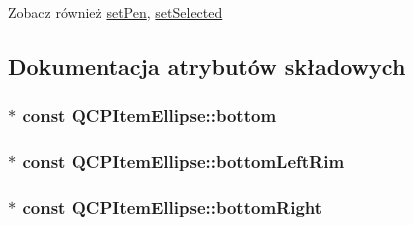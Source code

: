 \begin{DoxySeeAlso}{Zobacz również}
\hyperlink{class_q_c_p_item_ellipse_adb81a663ed2420fcfa011e49f678d1a6}{set\+Pen}, \hyperlink{class_q_c_p_abstract_item_a203de94ad586cc44d16c9565f49d3378}{set\+Selected} 
\end{DoxySeeAlso}


\subsection{Dokumentacja atrybutów składowych}
\subsubsection[{\texorpdfstring{bottom}{bottom}}]{$\ast$ const Q\+C\+P\+Item\+Ellipse\+::bottom}\hypertarget{class_q_c_p_item_ellipse_a2dc80ff9f5db600eae0133bdde65066f}{}\label{class_q_c_p_item_ellipse_a2dc80ff9f5db600eae0133bdde65066f}
\subsubsection[{\texorpdfstring{bottom\+Left\+Rim}{bottomLeftRim}}]{$\ast$ const Q\+C\+P\+Item\+Ellipse\+::bottom\+Left\+Rim}\hypertarget{class_q_c_p_item_ellipse_a31f31a9e9f9098c90fb47573094276c5}{}\label{class_q_c_p_item_ellipse_a31f31a9e9f9098c90fb47573094276c5}
\subsubsection[{\texorpdfstring{bottom\+Right}{bottomRight}}]{$\ast$ const Q\+C\+P\+Item\+Ellipse\+::bottom\+Right}\hypertarget{class_q_c_p_item_ellipse_ab73c8deafc0d8d1ef7d75b6cdcc37159}{}\label{class_q_c_p_item_ellipse_ab73c8deafc0d8d1ef7d75b6cdcc37159}
